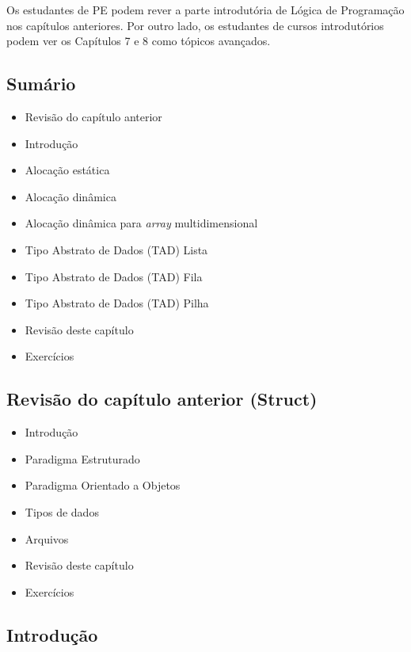 \documentclass[12pt,a4paper]{article}
\providecommand{\tightlist}{%
      \setlength{\itemsep}{0pt}\setlength{\parskip}{0pt}}
\begin{document}
Os estudantes de PE podem rever a parte introdutória de Lógica de
Programação nos capítulos anteriores. Por outro lado, os estudantes de
cursos introdutórios podem ver os Capítulos 7 e 8 como tópicos
avançados.

    \hypertarget{sumuxe1rio}{%
\subsection{Sumário}\label{sumuxe1rio}}

\begin{itemize}
\tightlist
\item
  Revisão do capítulo anterior
\item
  Introdução
\item
  Alocação estática
\item
  Alocação dinâmica
\item
  Alocação dinâmica para \emph{array} multidimensional
\item
  Tipo Abstrato de Dados (TAD) Lista
\item
  Tipo Abstrato de Dados (TAD) Fila
\item
  Tipo Abstrato de Dados (TAD) Pilha
\item
  Revisão deste capítulo
\item
  Exercícios
\end{itemize}

    \hypertarget{revisuxe3o-do-capuxedtulo-anterior-struct}{%
\subsection{Revisão do capítulo anterior
(Struct)}\label{revisuxe3o-do-capuxedtulo-anterior-struct}}

    \begin{itemize}
\tightlist
\item
  Introdução
\item
  Paradigma Estruturado
\item
  Paradigma Orientado a Objetos
\item
  Tipos de dados
\item
  Arquivos
\item
  Revisão deste capítulo
\item
  Exercícios
\end{itemize}

    \hypertarget{introduuxe7uxe3o}{%
\subsection{Introdução}\label{introduuxe7uxe3o}}
\end{document}
